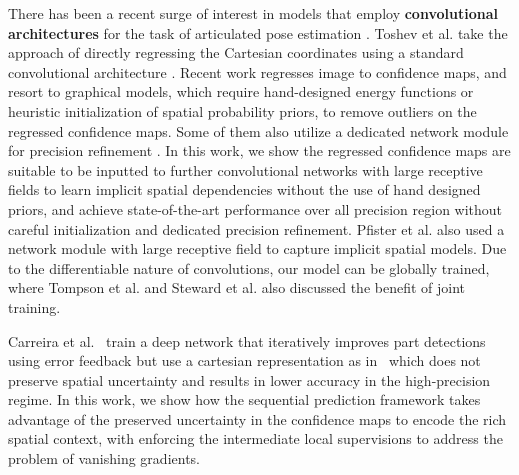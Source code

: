 \documentclass[10pt,twocolumn,letterpaper]{article}
\begin{document}
There has been a recent surge of interest in models that employ \textbf{convolutional architectures} for the task of articulated pose estimation \cite{ouyang2014multi,tompson2015cvpr,tompson2014joint,Chen_NIPS14,
carreia2015human,pishchulin2015deepcut,pfister2015flowing}. 
Toshev et al. \cite{toshev2013deeppose} take the approach of directly regressing the Cartesian coordinates using a standard convolutional architecture \cite{krizhevsky2012imagenet}.
Recent work regresses image to confidence maps, and resort to graphical models, which require hand-designed energy functions or heuristic initialization of spatial probability priors, to remove outliers on the regressed confidence maps. Some of them also utilize a dedicated network module for precision refinement \cite{tompson2015cvpr,pishchulin2015deepcut}.
In this work, we show the regressed confidence maps are suitable to be inputted to further convolutional networks with large receptive fields to learn implicit spatial dependencies without the use of hand designed priors, and achieve state-of-the-art performance over all precision region without careful initialization and dedicated precision refinement. Pfister et al. \cite{pfister2015flowing} also used a network module with large receptive field to capture implicit spatial models.
Due to the differentiable nature of convolutions, our model can be globally trained, where Tompson et al. \cite{tompson2014joint} and Steward et al. \cite{steward2015endtoend} also discussed the benefit of joint training.


Carreira et al.~\cite{carreia2015human} train a deep network that iteratively improves part detections using error feedback but use a cartesian representation as in~\cite{toshev2013deeppose} which does not preserve spatial uncertainty and results in lower accuracy in the high-precision regime.
In this work, we show how the sequential prediction framework takes advantage of the preserved uncertainty in the confidence maps to encode the rich spatial context, with enforcing the intermediate local supervisions to address the problem of vanishing gradients.
\end{document}
